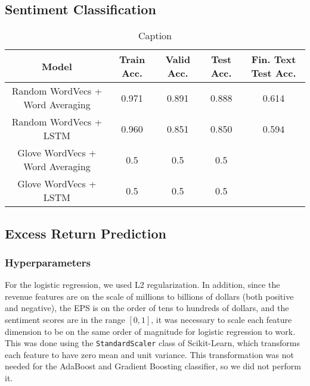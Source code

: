 \documentclass{article}
\begin{document}
\subsection{Sentiment Classification}
\begin{table}[]
    \centering
    \begin{tabular}{c|c|c|c|c}
    \hline
        Model & Train Acc. & Valid Acc. & Test Acc. & Fin. Text Test Acc.  \\
        \hline
          Random WordVecs + Word Averaging & 0.971 & 0.891 & 0.888 & 0.614 \\
         \hline
          Random WordVecs + LSTM & 0.960 & 0.851 & 0.850 & 0.594 \\
         \hline
          Glove WordVecs + Word Averaging & 0.5 & 0.5 & 0.5 \\
         \hline
          Glove WordVecs + LSTM & 0.5 & 0.5 & 0.5 \\
         \hline
    \end{tabular}
    \caption{Caption}
    \label{tab:my_label}
\end{table}

\subsection{Excess Return Prediction}%
\subsubsection{Hyperparameters}

For the logistic regression, we used L2 regularization.
In addition, since the revenue features are on the scale of millions to billions of dollars (both positive and negative), the EPS is on the order of tens to hundreds of dollars, and the sentiment scores are in the range $[0,1]$, it was necessary to scale each feature dimension to be on the same order of magnitude for logistic regression to work.
This was done using the \texttt{StandardScaler} class of Scikit-Learn, which transforms each feature to have zero mean and unit variance.
This transformation was not needed for the AdaBoost and Gradient Boosting classifier, so we did not perform it.
\end{document}
